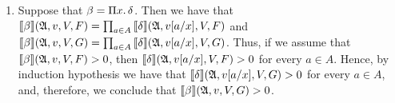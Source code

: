 \begin{enumerate}
\item Suppose that $\beta = \Pi{x}.\, \delta$. Then we have that ${\llbracket{}{\beta}\rrbracket}(\mathfrak{A},v,V,F) = \prod_{a \in A} {\llbracket{}{\delta}\rrbracket}(\mathfrak{A},v[a/x],V,F)$ and ${\llbracket{}{\beta}\rrbracket}(\mathfrak{A},v,V,G) = \prod_{a \in A} {\llbracket{}{\delta}\rrbracket}(\mathfrak{A},v[a/x],V,G)$. Thus, if we assume that ${\llbracket{}{\beta}\rrbracket}(\mathfrak{A},v,V,F) > 0$, then ${\llbracket{}{\delta}\rrbracket}(\mathfrak{A},v[a/x],V,F) > 0$ for every $a \in A$. Hence, by induction hypothesis we have that ${\llbracket{}{\delta}\rrbracket}(\mathfrak{A},v[a/x],V,G) > 0$ for every $a \in A$, and, therefore, we conclude that ${\llbracket{}{\beta}\rrbracket}(\mathfrak{A},v,V,G) >0$.


\end{enumerate}
%
